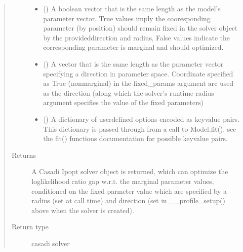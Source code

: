 \documentclass[letterpaper,10pt,english,openany,oneside]{sphinxmanual}
\begin{document}
\begin{fulllineitems}
\begin{fulllineitems}
\begin{quote}
\begin{description}
\begin{itemize}
\item {} 
 (\sphinxstyleliteralemphasis{\sphinxupquote{, }}) \textendash{} A boolean vector that is the same length as the
model’s parameter vector. True values imply the cooresponding parameter (by position)
should remain fixed in the solver object by the provideddirection and radius,
False values indicate the corresponding parameter is marginal and should optimized.

\item {} 
 (\sphinxstyleliteralemphasis{\sphinxupquote{, }}) \textendash{} A vector that is the same length as the parameter vector
specifying a direction in parameter space. Coordinate specified as True (non\sphinxhyphen{}marginal)
in the fixed\_params argument are used as the direction (along which the solver’s
run\sphinxhyphen{}time radius argument specifies the value of the fixed parameters)

\item {} 
 () \textendash{} A dictionary of user\sphinxhyphen{}defined options encoded as key\sphinxhyphen{}value
pairs. This dictionary is passed through from a call to Model.fit(), see
the fit() functions documentation for possible key\sphinxhyphen{}value pairs.

\end{itemize}

\item[{Returns}] \leavevmode
A Casadi Ipopt solver object is returned, which can optimize the
loglikelihood ratio gap w.r.t. the marginal parameter values, conditioned on the fixed
parmeter value which are specified by a radius (set at call time) and direction (set in
\_\_profile\_setup() above when the solver is created).

\item[{Return type}] \leavevmode
casadi solver

\end{description}\end{quote}

\end{fulllineitems}


\end{fulllineitems}
\end{document}
